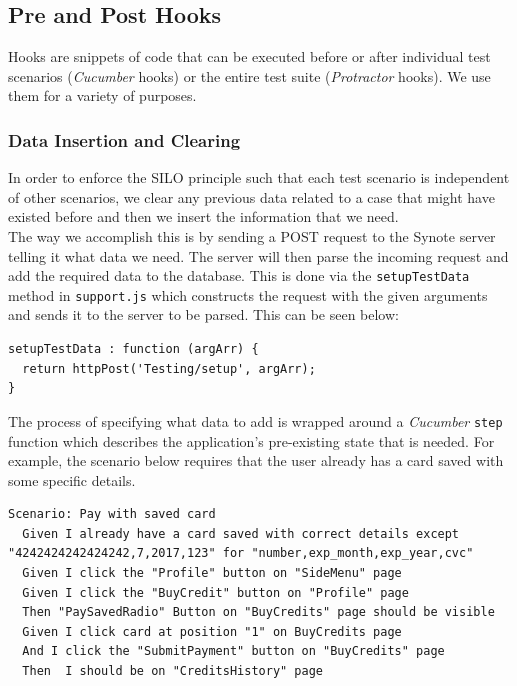 \subsection{Pre and Post Hooks}
\label{subsec:pre-and-post-hooks}

Hooks are snippets of code that can be executed before or after individual test scenarios (\textit{Cucumber} hooks) or the entire test suite (\textit{Protractor} hooks). We use them for a variety of purposes.

\subsubsection{Data Insertion and Clearing}
\label{subsubsec:data-insertion-and-clearing}
In order to enforce the SILO principle such that each test scenario is independent of other scenarios, we clear any previous data related to a case that might have existed before and then we insert the information that we need.\\

The way we accomplish this is by sending a POST request to the Synote server telling it what data we need. The server will then parse the incoming request and add the required data to the database. This is done via the \texttt{setupTestData} method in \texttt{support.js} which constructs the request with the given arguments and sends it to the server to be parsed. This can be seen below:

\begin{listing}[H]
\begin{verbatim}
setupTestData : function (argArr) {
  return httpPost('Testing/setup', argArr);
}
\end{verbatim}
\label{lst:inserting-test-data}
\end{listing}

The process of specifying what data to add is wrapped around a \textit{Cucumber} \texttt{step} function which describes the application's pre-existing state that is needed. For example, the scenario below requires that the user already has a card saved with some specific details.

\begin{listing}[H]
\begin{verbatim}
Scenario: Pay with saved card
  Given I already have a card saved with correct details except "4242424242424242,7,2017,123" for "number,exp_month,exp_year,cvc"
  Given I click the "Profile" button on "SideMenu" page
  Given I click the "BuyCredit" button on "Profile" page
  Then "PaySavedRadio" Button on "BuyCredits" page should be visible
  Given I click card at position "1" on BuyCredits page
  And I click the "SubmitPayment" button on "BuyCredits" page
  Then  I should be on "CreditsHistory" page
\end{verbatim}
\label{lst:example-scenario-with-db-setup}
\end{listing}

